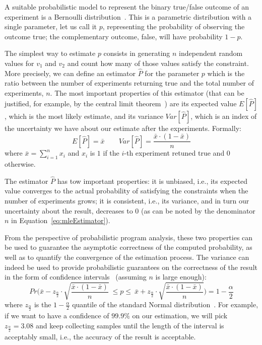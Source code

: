 A suitable probabilistic model to represent the binary true/false outcome of an experiment is a Bernoulli distribution~\cite{pestman1998mathematical}. This is a parametric distribution with a single parameter, let us call it $p$, representing the probability of observing the outcome true; the complementary outcome, false, will have probability $1-p$.

The simplest way to estimate $p$ consists in generating $n$ independent random values for $v_1$ and $v_2$ and count how many of those values satisfy the constraint. More precisely, we can define an estimator $\hat{P}$ for the parameter $p$ which is the ratio between the number of experiments returning true and the total number of experiments, $n$. The most important properties of this estimator (that can be justified, for example, by the central limit theorem~\cite{pestman1998mathematical}) are its expected value $E[\hat{P}]$, which is the most likely estimate, and its variance $Var[\hat{P}]$, which is an index of the uncertainty we have about our estimate after the experiments. Formally:
%
\begin{equation}\label{eq:mleEstimator}
	E[\hat{P}] = \bar{x} \qquad Var[\hat{P}] = \frac{\bar{x} \cdot (1-\bar{x})}{n}
\end{equation}
%
\noindent where $\bar{x}=\sum_{i=1}^n x_i$ and $x_i$ is $1$ if the $i$-th experiment retuned true and $0$ otherwise.

The estimator $\hat{P}$ has tow important properties: it is unbiased, i.e., its expected value converges to the actual probability of satisfying the constraints when the number of experiments grows; it is consistent, i.e., its variance, and in turn our uncertainty about the result, decreases to 0 (as can be noted by the denominator $n$ in Equation~\eqref{eq:mleEstimator}).

From the perspective of probabilistic program analysis, these two properties can be used to guarantee the asymptotic correctness of the computed probability, as well as to quantify the convergence of the estimation process. The variance can indeed be used to provide probabilistic guarantees on the correctness of the result in the form of confidence intervals~\cite{pestman1998mathematical} (assuming $n$ is large enough):
%
\begin{equation}\label{eqConfidenceInterval}
	Pr\Big( \bar{x} - z_{\frac{\alpha}{2}} \cdot \sqrt{\frac{\bar{x} \cdot (1-\bar{x})}{n}} \ \leq p \leq \ \bar{x} + z_{\frac{\alpha}{2}} \cdot \sqrt{\frac{\bar{x} \cdot (1-\bar{x})}{n}} \Big) = 1-\frac{\alpha}{2}
\end{equation}
%
\noindent where $z_{\frac{\alpha}{2}}$ is the $1-\frac{\alpha}{2}$ quantile of the standard Normal distribution~\cite{pestman1998mathematical}. For example, if we want to have a confidence of $99.9\%$ on our estimation, we will pick $z_{\frac{\alpha}{2}}=3.08$ and keep collecting samples until the length of the interval is acceptably small, i.e., the accuracy of the result is acceptable.

